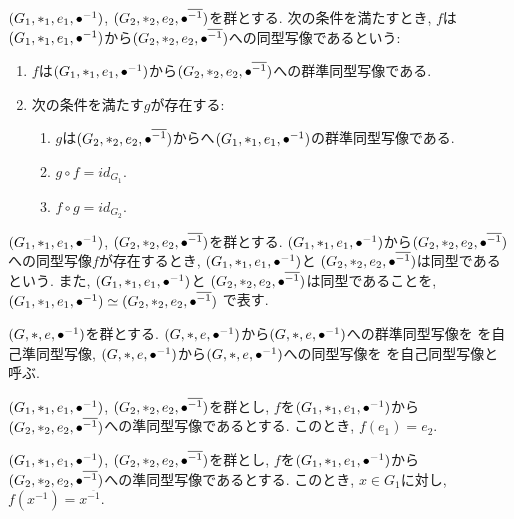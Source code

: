 \begin{definition}
  $(G_1,\ast_1,e_1,{\bullet}^{-1})$,
  $(G_2,\ast_2,e_2,{\bullet}^{\overline{-1}})$を群とする.
  次の条件を満たすとき,
  $f$は$(G_1,\ast_1,e_1,{\bullet}^{-1})$から$(G_2,\ast_2,e_2,{\bullet}^{\overline{-1}})$への同型写像であるという:
  \begin{enumerate}
    \item $f$は$(G_1,\ast_1,e_1,{\bullet}^{-1})$から$(G_2,\ast_2,e_2,{\bullet}^{\overline{-1}})$への群準同型写像である.
    \item 次の条件を満たす$g$が存在する:
      \begin{enumerate}
      \item $g$は$(G_2,\ast_2,e_2,{\bullet}^{\overline{-1}})$からへ$(G_1,\ast_1,e_1,{\bullet}^{-1})$の群準同型写像である.
      \item $g\circ f = id_{G_1}$.
      \item $f\circ g = id_{G_2}$.
      \end{enumerate}
  \end{enumerate}
\end{definition}
\begin{definition}
  $(G_1,\ast_1,e_1,{\bullet}^{-1})$,
  $(G_2,\ast_2,e_2,{\bullet}^{\overline{-1}})$を群とする.
  $(G_1,\ast_1,e_1,{\bullet}^{-1})$から$(G_2,\ast_2,e_2,{\bullet}^{\overline{-1}})$への同型写像$f$が存在するとき,
  $(G_1,\ast_1,e_1,{\bullet}^{-1})$と
  $(G_2,\ast_2,e_2,{\bullet}^{\overline{-1}})$は同型であるという.
  また,
  $(G_1,\ast_1,e_1,{\bullet}^{-1})$と
  $(G_2,\ast_2,e_2,{\bullet}^{\overline{-1}})$は同型であることを,
  $(G_1,\ast_1,e_1,{\bullet}^{-1})\simeq(G_2,\ast_2,e_2,{\bullet}^{\overline{-1}})$
  で表す.
\end{definition}

\begin{remark}
  $(G,\ast,e,{\bullet}^{-1})$を群とする.
  $(G,\ast,e,{\bullet}^{-1})$から$(G,\ast,e,{\bullet}^{-1})$への群準同型写像を
  を自己準同型写像,
  $(G,\ast,e,{\bullet}^{-1})$から$(G,\ast,e,{\bullet}^{-1})$への同型写像を
  を自己同型写像と呼ぶ.
\end{remark}

\begin{prop}
  $(G_1,\ast_1,e_1,{\bullet}^{-1})$,
  $(G_2,\ast_2,e_2,{\bullet}^{\overline{-1}})$を群とし,
  $f$を$(G_1,\ast_1,e_1,{\bullet}^{-1})$から$(G_2,\ast_2,e_2,{\bullet}^{\overline{-1}})$への準同型写像であるとする.
  このとき, $f(e_1)=e_2$.
\end{prop}

\begin{prop}
  $(G_1,\ast_1,e_1,{\bullet}^{-1})$,
  $(G_2,\ast_2,e_2,{\bullet}^{\overline{-1}})$を群とし,
  $f$を$(G_1,\ast_1,e_1,{\bullet}^{-1})$から$(G_2,\ast_2,e_2,{\bullet}^{\overline{-1}})$への準同型写像であるとする.
  このとき, $x\in G_1$に対し, $f(x^{-1})=x^{\overline{-1}}$.
\end{prop}

